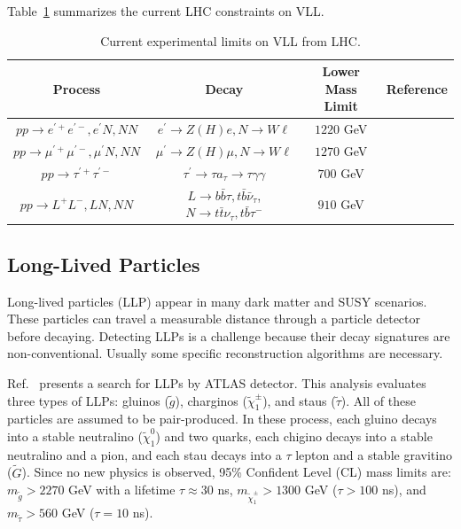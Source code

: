\documentclass[a4paper,11pt]{article}
\begin{document}
Table~\ref{table:vll} summarizes the current LHC constraints on VLL.
\begin{table}
  
  \centering 
    \begin{tabular}{cccc}
    Process  & Decay & Lower Mass Limit & Reference\\
    \hline
$pp\to e^{\prime+}e^{\prime-}, e^\prime N, NN$  & $e^\prime\to Z(H)e, N\to W\ell$ &  
$1220$ GeV  &     \cite{ATLAS:2024mrr}         \\%
$pp\to\mu^{\prime+}\mu^{\prime-}, \mu^\prime N, NN$  & $\mu^\prime\to Z(H)\mu, N\to W\ell$ &  
$1270$ GeV  &    \cite{ATLAS:2024mrr}       \\%
$pp\to \tau^{\prime+}\tau^{\prime-}$  & $\tau^\prime\to \tau a_\tau \to \tau\gamma\gamma$  & $700$ GeV  &    \cite{CMS:2025urb}        \\%
$pp\to L^{+}L^{-}, L N, NN$ & $L\to b\bar{b}\tau, t\bar{b}\bar{\nu}_\tau$, $N\to t\bar{t}\nu_\tau, t\bar{b}\tau^-$ & $910$ GeV & \cite{ATLAS:2025wgc} \\%
    \hline
    \end{tabular}
\caption{Current experimental limits on VLL from LHC.} 
\label{table:vll}
  \end{table}

\subsection{Long-Lived Particles}
Long-lived particles (LLP) appear in many dark matter and SUSY scenarios. 
These particles can travel a measurable distance through a particle detector before decaying. 
Detecting LLPs is a challenge because their decay signatures are non-conventional.
Usually some specific reconstruction algorithms are necessary.

Ref.~\cite{ATLAS:2025fdm} presents a search for LLPs by ATLAS detector. 
This analysis evaluates three types of LLPs: gluinos ($\tilde{g}$), charginos ($\tilde{\chi}^\pm_1$), and staus ($\tilde{\tau}$).
All of these particles are assumed to be pair-produced. 
In these process, each gluino decays into a stable neutralino ($\tilde{\chi}^0_1$) and two quarks, 
each chigino decays into a stable neutralino and a pion, 
and each stau decays into a $\tau$ lepton and a stable gravitino ($\tilde{G}$). 
Since no new physics is observed, 95\% Confident Level (CL) mass limits are: $m_{\tilde{g}}>2270$ GeV with a lifetime $\tau\approx 30$ ns, $m_{\tilde{\chi}^\pm_1}>1300$ GeV ($\tau>100$ ns), and $m_{\tilde{\tau}}>560$ GeV ($\tau=10$ ns).
\end{document}
